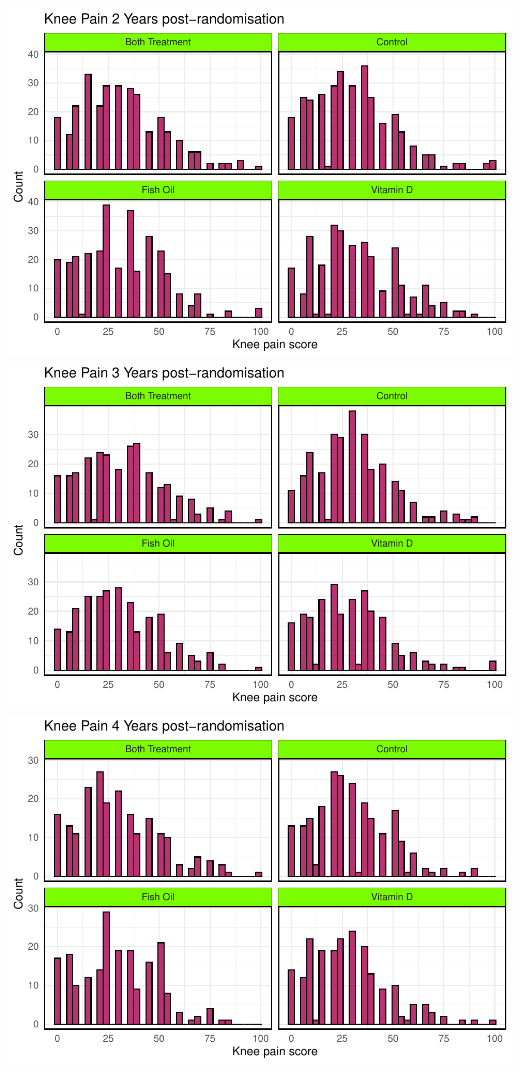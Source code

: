 \documentclass{article}
\newcommand{\pandocbounded}[1]{#1}
\begin{document}
\pandocbounded{\includegraphics[keepaspectratio]{Final_Report_files/figure-latex/unnamed-chunk-7-3.pdf}}
\pandocbounded{\includegraphics[keepaspectratio]{Final_Report_files/figure-latex/unnamed-chunk-7-4.pdf}}
\pandocbounded{\includegraphics[keepaspectratio]{Final_Report_files/figure-latex/unnamed-chunk-7-5.pdf}}
\end{document}

